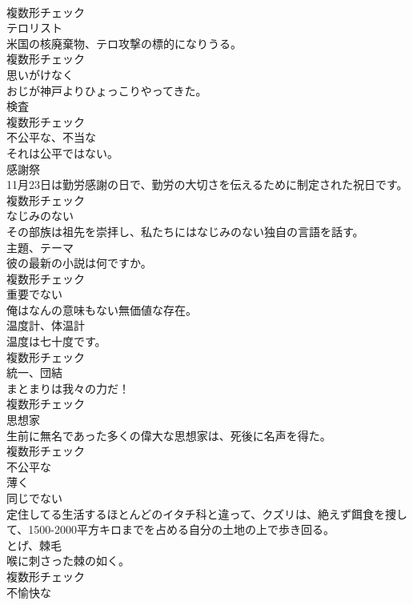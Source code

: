 \documentclass[8pt]{extreport}
\begin{document}
\begin{CJK}{UTF8}{min}
\\	複数形チェック
\\	[名詞]	テロリスト	
\\	米国の核廃棄物、テロ攻撃の標的になりうる。	
\\	複数形チェック
\\	[副詞]	思いがけなく	
\\	おじが神戸よりひょっこりやってきた。	
\\	[名詞]	検査	
\\	複数形チェック
\\	[形容詞]	不公平な、不当な	
\\	それは公平ではない。	
\\	[名詞]	感謝祭	
\\	11月23日は勤労感謝の日で、勤労の大切さを伝えるために制定された祝日です。	
\\	複数形チェック
\\	[形容詞]	なじみのない	
\\	その部族は祖先を崇拝し、私たちにはなじみのない独自の言語を話す。	
\\	[名詞]	主題、テーマ	
\\	彼の最新の小説は何ですか。	
\\	複数形チェック
\\	[形容詞]	重要でない	
\\	俺はなんの意味もない無価値な存在。	
\\	[名詞]	温度計、体温計	
\\	温度は七十度です。	
\\	複数形チェック
\\	[名詞]	統一、団結	
\\	まとまりは我々の力だ！	
\\	複数形チェック
\\	[名詞]	思想家	
\\	生前に無名であった多くの偉大な思想家は、死後に名声を得た。	
\\	複数形チェック
\\	[形容詞]	不公平な	
\\	[副詞]	薄く	
\\	[形容詞]	同じでない	
\\	定住してる生活するほとんどのイタチ科と違って、クズリは、絶えず餌食を捜して、1500-2000平方キロまでを占める自分の土地の上で歩き回る。	
\\	[名詞]	とげ、棘毛	
\\	喉に刺さった棘の如く。	
\\	複数形チェック
\\	[形容詞]	不愉快な	

\end{CJK}
\end{document}
